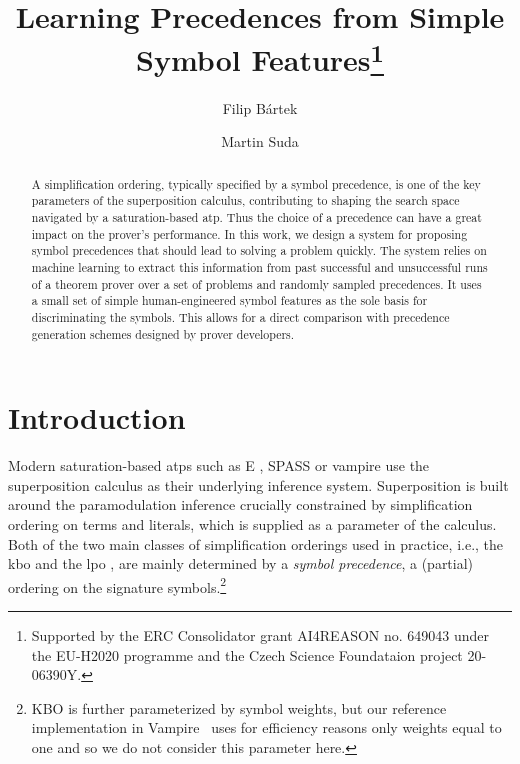 

\title{Learning Precedences from Simple Symbol Features\thanks{Supported by the ERC Consolidator grant AI4REASON no. 649043 under the EU-H2020 programme and the Czech Science Foundataion project 20-06390Y.}}
\author{Filip B\'{a}rtek \and Martin Suda}



\maketitle

\begin{abstract}
A simplification ordering, typically specified by a symbol precedence,
is one of the key parameters of the superposition calculus, contributing
to shaping the search space navigated by a saturation-based \acrlong*{atp}.
Thus the choice of a precedence can have a great impact on the prover's performance.
In this work, we design a system for proposing symbol precedences
that should lead to solving a problem quickly.
The system relies on machine learning to extract this information from
past successful and unsuccessful runs of a theorem prover over a set of problems and randomly sampled precedences.
It uses a small set of simple human-engineered symbol features as the sole
basis for discriminating the symbols. This allows for a direct comparison
with precedence generation schemes designed by prover developers.
\end{abstract}

\section{Introduction}

Modern saturation-based \glspl*{atp} such as E \cite{SCV:CADE-2019}, SPASS \cite{DBLP:conf/cade/WeidenbachDFKSW09} 
or \gls*{vampire} \cite{Kovacs2013}
use the superposition calculus \cite{Nieuwenhuis2001} as their underlying inference system.
Superposition is built around the paramodulation inference \cite{Robinson1983} crucially
constrained by simplification ordering on terms and literals, which is supplied as a parameter of the calculus.
Both of the two main classes of simplification orderings used in practice,
i.e., the \acrlong*{kbo} \cite{Knuth1983}
and the \acrlong*{lpo} \cite{Kamin1980},
are mainly determined by a %
\emph{symbol precedence}, a (partial) ordering on the signature symbols.\footnote{KBO is further parameterized by symbol weights, but our reference implementation in Vampire~\cite{Kovacs2013} 
uses for efficiency reasons only weights equal to one \cite{DBLP:conf/cade/KovacsMV11} and so we do not consider this parameter here.}

